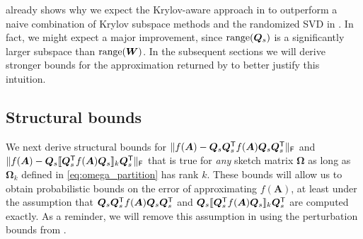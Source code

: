  already shows why we expect the Krylov-aware approach in  to outperform a naive combination of Krylov subspace methods and the randomized SVD in . In fact, we might expect a major improvement, since $\operatorname{range}(\bm{Q}_s)$ is a significantly larger subspace than $\operatorname{range}(\bm{W})$. In the subsequent sections we will derive stronger bounds for the approximation returned by  to better justify this intuition.

\subsection{Structural bounds}\label{section:structural}
We next derive structural bounds for $\|f(\bm{A})- \bm{Q}_s \bm{Q}_s^{\textsf{\textup{T}}} f(\bm{A}) \bm{Q}_s \bm{Q}_s^{\textsf{\textup{T}}}\|_{\textsf{\textup{F}}}$ and $\|f(\bm{A})- \bm{Q}_s \llbracket \bm{Q}_s^{\textsf{\textup{T}}} f(\bm{A}) \bm{Q}_s\rrbracket_k \bm{Q}_s^{\textsf{\textup{T}}}\|_{\textsf{\textup{F}}}$ that is true for \textit{any} sketch matrix $\bm{\Omega}$ as long as $\bm{\Omega}_k$ defined in \eqref{eq:omega_partition} has rank $k$. These bounds will allow us to obtain probabilistic bounds on the error of approximating $f(\bm{A})$, at least under the assumption that $\bm{Q}_s \bm{Q}_s^{\textsf{\textup{T}}} f(\bm{A}) \bm{Q}_s \bm{Q}_s^{\textsf{\textup{T}}}$ and $\bm{Q}_s \llbracket \bm{Q}_s^{\textsf{\textup{T}}} f(\bm{A}) \bm{Q}_s\rrbracket_k \bm{Q}_s^{\textsf{\textup{T}}}$ are computed exactly. As a reminder, we will remove this assumption in  using the perturbation bounds from .

